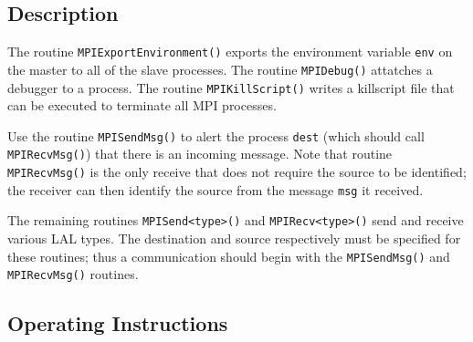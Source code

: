 \documentclass{article}
\begin{document}
\subsection{Description}

The routine \verb+MPIExportEnvironment()+ exports the environment variable
\verb+env+ on the master to all of the slave processes.  The routine
\verb+MPIDebug()+ attatches a debugger to a process.  The routine
\verb+MPIKillScript()+ writes a killscript file that can be executed to
terminate all MPI processes.

Use the routine \verb+MPISendMsg()+ to alert the process \verb+dest+ (which
should call \verb+MPIRecvMsg()+) that there is an incoming message.  Note that
routine \verb+MPIRecvMsg()+ is the only receive that does not require the
source to be identified; the receiver can then identify the source from the
message \verb+msg+ it received.

The remaining routines \verb+MPISend<type>()+ and \verb+MPIRecv<type>()+ send
and receive various LAL types.  The destination and source respectively must
be specified for these routines; thus a communication should begin with the
\verb+MPISendMsg()+ and \verb+MPIRecvMsg()+ routines.


\subsection{Operating Instructions}
\end{document}
